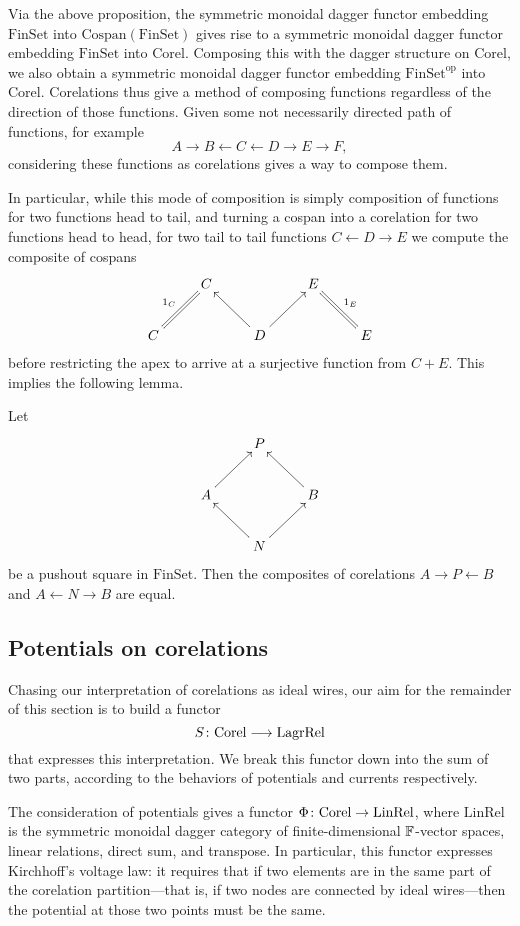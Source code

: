 Via the above proposition, the symmetric monoidal dagger functor embedding
$\mathrm{FinSet}$ into $\mathrm{Cospan(FinSet)}$ gives rise to a symmetric
monoidal dagger functor embedding $\mathrm{FinSet}$ into $\mathrm{Corel}$.
Composing this with the dagger structure on $\mathrm{Corel}$, we also obtain a
symmetric monoidal dagger functor embedding $\mathrm{FinSet}^{\mathrm{op}}$ into
$\mathrm{Corel}$.  Corelations thus give a method of composing functions
regardless of the direction of those functions.  Given some not necessarily
directed path of functions, for example
\[
  A \longrightarrow B \longleftarrow C \longleftarrow D \longrightarrow E
  \longrightarrow F,
\]
considering these functions as corelations gives a way to compose them.

In particular, while this mode of composition is simply composition of functions
for two functions head to tail, and turning a cospan into a corelation for two
functions head to head, for two tail to tail functions $C \leftarrow D
\rightarrow E$ we compute the composite of cospans
\[
  \xymatrix{
  & C && E \\
  C \ar@{=}[ur]^{1_C} && D \ar[ul] \ar[ur] && E \ar@{=}[ul]_{1_E}
  }
\]
before restricting the apex to arrive at a surjective function from $C+E$. This
implies the following lemma. 

\begin{lemma} \label{lem:pushoutcorelations}
  Let 
\[
  \xymatrix{
    & P \\
    A \ar[ur] && B \ar[ul] \\
    & N \ar[ur] \ar[ul]
  }
\]
be a pushout square in $\mathrm{FinSet}$. Then the composites of corelations $A
\rightarrow P \leftarrow B$ and $A \leftarrow N \rightarrow B$ are equal.
\end{lemma}

\subsection{Potentials on corelations} \label{ssec:potentialsoncorelations}

Chasing our interpretation of corelations as ideal wires, our aim for the
remainder of this section is to build a functor
\[
  S{\colon} \mathrm{Corel} \longrightarrow \mathrm{LagrRel}
\]
that expresses this interpretation. We break this functor down into the sum 
of two parts, according to the behaviors of potentials and currents
respectively. 

The consideration of potentials gives a functor $\Phi{\colon} \mathrm{Corel}
\to \mathrm{LinRel}$, where $\mathrm{LinRel}$ is the symmetric
monoidal dagger category of finite-dimensional ${\mathbb F}$-vector spaces, linear
relations, direct sum, and transpose. In particular, this functor expresses
Kirchhoff's voltage law: it requires that if two elements are in the same part
of the corelation partition---that is, if two nodes are connected by ideal
wires---then the potential at those two points must be the same.

